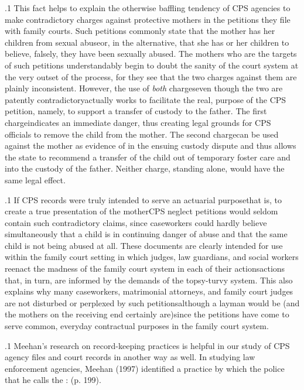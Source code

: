 \documentclass[11pt, twoside]{article}
\begin{document}
{\p.1{%
This fact helps to explain the otherwise baffling tendency of CPS agencies to make contradictory charges against protective mothers in the
 petitions they file with family courts. Such petitions commonly
state that the mother has  her children from sexual
abuse\mdash{}or, in the alternative, that she has  or  her
children to believe, falsely, they have been sexually abused. The mothers
who are the targets of such petitions understandably begin to doubt the
sanity of the court system at the very outset of the process, for they see
that the two charges against them are plainly inconsistent. However, the
use of \textit{both} charges\mdash{}even though the two are patently
contradictory\mdash{}actually works to facilitate the real,  purpose of the CPS
petition, namely, to support a transfer of custody to the father. The first
charge\mdash{}\mdash{}indicates an immediate danger, thus creating legal grounds for CPS officials to remove the child from the mother.
The second charge\mdash{}\mdash{}can be used against the mother as
evidence of  in the ensuing custody dispute and thus allows
the state to recommend a transfer of the child out of temporary foster
care and into the custody of the father. Neither charge, standing alone,
would have the same legal effect.
}%

\p.1{%
If CPS records were truly intended to serve an actuarial
purpose\mdash{}that is, to create a true presentation of the mother\mdash{}CPS neglect petitions would seldom contain such contradictory claims, since caseworkers could hardly believe simultaneously that a child is in continuing
danger of abuse and that the same child is not being abused at all.
These documents are clearly intended for  use within the
family court setting in which judges, law guardians, and social workers
reenact the madness of the family court system in each of
their actions\mdash{}actions that, in turn, are informed by the demands of the topsy-turvy
system. This also explains why many caseworkers, matrimonial attorneys, and family court judges are not disturbed or perplexed by such
petitions\mdash{}although a layman would be (and the mothers on
the receiving end certainly are)\mdash{}since the petitions have come to serve common,
everyday contractual purposes in the family court system.
}%

\p.1{%
Meehan’s research on record-keeping practices is helpful in our study
of CPS agency files and court records in another way as well. In studying
law enforcement agencies, Meehan (1997) identified a practice by which
the police  that he calls the :  (p. 199).
}%

}
\end{document}
